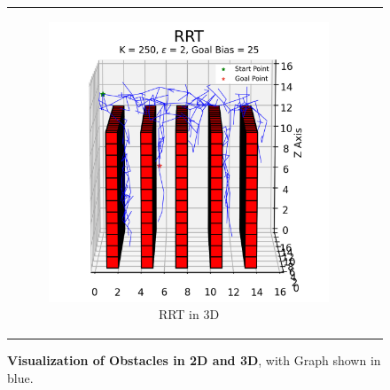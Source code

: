 \begin{figure}[H]
\begin{centering}
\begin{tabular}{cc}
    \begin{subfigure}{0.47\linewidth}
    \includegraphics[width=\linewidth]{chapters/chapter2/img/visualizing/tree3d.png}
    \caption{RRT in 3D}
    \end{subfigure} \\

\end{tabular}
\caption[Complete Visualization of RRT in 2D and 3D]{\textbf{Visualization of Obstacles in 2D and 3D}, with Graph shown in blue.}
\label{fig:rrt_full}
\end{centering}
\end{figure}